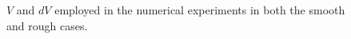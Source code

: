 \begin{figure}[t]
        \centering
        \resizebox{0.6\linewidth}{!}{ }  
        \caption{$V$ and $dV$ employed in the numerical experiments in both the smooth and rough cases.}
        \label{fig:PlotsVSmoothRough}
\end{figure}


